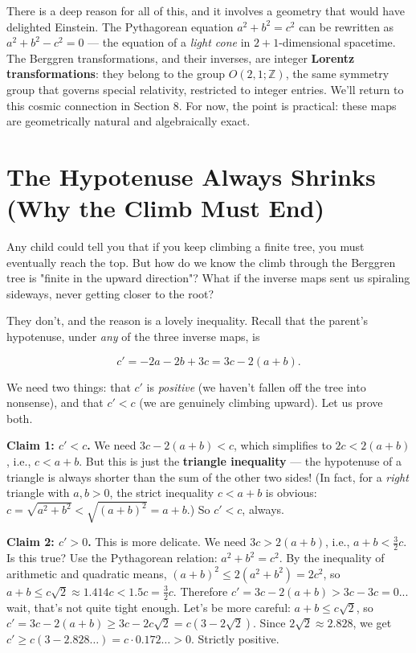 \documentclass[11pt,twoside,openright]{book}
\theoremstyle{definition}
\theoremstyle{remark}
\begin{document}
There is a deep reason for all of this, and it involves a geometry that would have delighted Einstein. The Pythagorean equation $a^2 + b^2 = c^2$ can be rewritten as $a^2 + b^2 - c^2 = 0$ --- the equation of a \textit{light cone} in $2+1$-dimensional spacetime. The Berggren transformations, and their inverses, are integer \textbf{Lorentz transformations}: they belong to the group $O(2,1;\mathbb{Z})$, the same symmetry group that governs special relativity, restricted to integer entries. We'll return to this cosmic connection in Section 8. For now, the point is practical: these maps are geometrically natural and algebraically exact.



\section{The Hypotenuse Always Shrinks (Why the Climb Must End)}

Any child could tell you that if you keep climbing a finite tree, you must eventually reach the top. But how do we know the climb through the Berggren tree is "finite in the upward direction"? What if the inverse maps sent us spiraling sideways, never getting closer to the root?

They don't, and the reason is a lovely inequality. Recall that the parent's hypotenuse, under \textit{any} of the three inverse maps, is

\[c' = -2a - 2b + 3c = 3c - 2(a + b).\]

We need two things: that $c'$ is \textit{positive} (we haven't fallen off the tree into nonsense), and that $c' < c$ (we are genuinely climbing upward). Let us prove both.

\textbf{Claim 1: $c' < c$.} We need $3c - 2(a+b) < c$, which simplifies to $2c < 2(a+b)$, i.e., $c < a + b$. But this is just the \textbf{triangle inequality} --- the hypotenuse of a triangle is always shorter than the sum of the other two sides! (In fact, for a \textit{right} triangle with $a, b > 0$, the strict inequality $c < a + b$ is obvious: $c = \sqrt{a^2 + b^2} < \sqrt{(a+b)^2} = a + b$.) So $c' < c$, always.

\textbf{Claim 2: $c' > 0$.} This is more delicate. We need $3c > 2(a+b)$, i.e., $a + b < \frac{3}{2}c$. Is this true? Use the Pythagorean relation: $a^2 + b^2 = c^2$. By the inequality of arithmetic and quadratic means, $(a + b)^2 \leq 2(a^2 + b^2) = 2c^2$, so $a + b \leq c\sqrt{2} \approx 1.414c < 1.5c = \frac{3}{2}c$. Therefore $c' = 3c - 2(a+b) > 3c - 3c = 0$... wait, that's not quite tight enough. Let's be more careful: $a + b \leq c\sqrt{2}$, so $c' = 3c - 2(a+b) \geq 3c - 2c\sqrt{2} = c(3 - 2\sqrt{2})$. Since $2\sqrt{2} \approx 2.828$, we get $c' \geq c(3 - 2.828\ldots) = c \cdot 0.172\ldots > 0$. Strictly positive.
\end{document}
